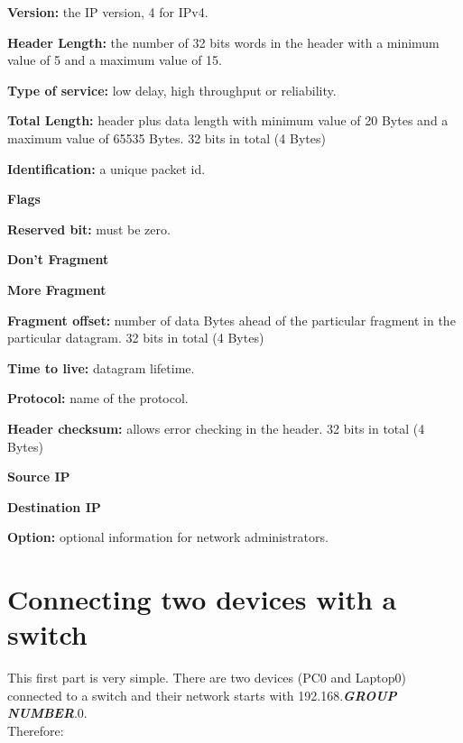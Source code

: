\documentclass[11pt,a4paper]{report}
\begin{document}
        \begin{compactitem}
            \item \textbf{Version:} the IP version, 4 for IPv4.
            \item \textbf{Header Length:} the number of 32 bits words in the header with a minimum value of 5 and a maximum value of 15.
            \item \textbf{Type of service:} low delay, high throughput or reliability.
            \item \textbf{Total Length:} header plus data length with minimum value of 20 Bytes and a maximum value of 65535 Bytes.
                32 bits in total (4 Bytes)
            \item \textbf{Identification:} a unique packet id.
            \item \textbf{Flags}
            \begin{compactitem}
                \item \textbf{Reserved bit:} must be zero.
                \item \textbf{Don't Fragment}
                \item \textbf{More Fragment}
            \end{compactitem}
        \item \textbf{Fragment offset:} number of data Bytes ahead of the particular fragment in the particular datagram.
                32 bits in total (4 Bytes)
            \item \textbf{Time to live:} datagram lifetime.
            \item \textbf{Protocol:} name of the protocol.
            \item \textbf{Header checksum:} allows error checking in the header.
                32 bits in total (4 Bytes)
            \item \textbf{Source IP}
            \item \textbf{Destination IP}
            \item \textbf{Option:} optional information for network administrators.
        \end{compactitem}

    \section{Connecting two devices with a switch}
        This first part is very simple. There are two devices (PC0 and Laptop0) connected to a switch and their network starts with 192.168.\textbf{\textit{GROUP NUMBER}}.0.\\
        Therefore:
\end{document}
